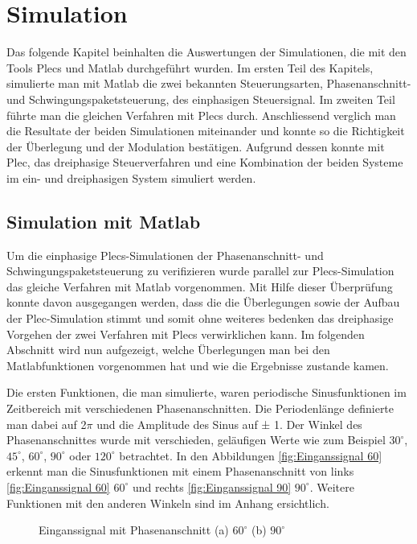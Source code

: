 \section{Simulation}

Das folgende Kapitel beinhalten die Auswertungen der Simulationen, die mit den Tools Plecs und Matlab durchgeführt wurden. Im ersten Teil des Kapitels, simulierte man mit Matlab die zwei bekannten Steuerungsarten, Phasenanschnitt- und Schwingungspaketsteuerung, des einphasigen Steuersignal. Im zweiten Teil führte man die gleichen Verfahren mit Plecs durch. Anschliessend verglich man die Resultate der beiden Simulationen miteinander und konnte so die Richtigkeit der Überlegung und der Modulation bestätigen. Aufgrund dessen konnte mit Plec, das dreiphasige Steuerverfahren und eine Kombination der beiden Systeme im ein- und dreiphasigen System simuliert werden. 



\subsection{Simulation mit Matlab}
Um die einphasige Plecs-Simulationen der Phasenanschnitt- und Schwingungspaketsteuerung zu verifizieren wurde parallel zur Plecs-Simulation das gleiche Verfahren mit Matlab vorgenommen. Mit Hilfe dieser Überprüfung konnte davon ausgegangen werden, dass die die Überlegungen sowie der Aufbau der Plec-Simulation stimmt und somit ohne weiteres bedenken das dreiphasige Vorgehen der zwei Verfahren mit Plecs verwirklichen kann. Im folgenden Abschnitt wird nun aufgezeigt, welche Überlegungen man bei den Matlabfunktionen vorgenommen hat und wie die Ergebnisse zustande kamen.

Die ersten Funktionen, die man simulierte, waren periodische Sinusfunktionen im Zeitbereich mit verschiedenen Phasenanschnitten. Die Periodenlänge definierte man dabei auf 2$\pi$ und die Amplitude des Sinus auf ± 1. Der Winkel des Phasenanschnittes wurde mit verschieden, geläufigen Werte wie zum Beispiel $30^\circ$, $45^\circ$, $60^\circ$, $90^\circ$ oder $120^\circ$ betrachtet. In den Abbildungen \ref{fig:Einganssignal 60} erkennt man die Sinusfunktionen mit einem Phasenanschnitt von links \ref{fig:Einganssignal 60} $60^\circ$ und rechts \ref{fig:Einganssignal 90} $90^\circ$. Weitere Funktionen mit den anderen Winkeln sind im Anhang ersichtlich.
 

\begin{figure}[h]
	\centering
	\qquad
	\caption{Einganssignal mit Phasenanschnitt (a) $60^\circ$ (b) $90^\circ$}
	\label{fig:eingangssignal_mit_Matlab}
\end{figure} 


